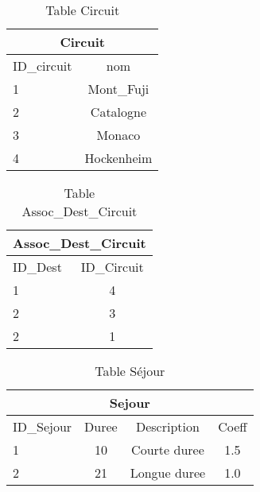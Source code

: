
\begin{table}[h]
\begin{center}
\begin{tabular}{|l|c|}
\hline
\multicolumn{2}{|c|}{Circuit}\\
\hline
ID\_circuit& nom \\
\hline
1 & Mont\_Fuji\\
\hline
2 & Catalogne\\
\hline
3 & Monaco\\
\hline
4 &  Hockenheim\\
\hline
\end{tabular}
\end{center}
\caption{Table Circuit}
\end{table}
\newpage


\begin{table}[h]
\begin{center}
\begin{tabular}{|l|c|}
\hline
\multicolumn{2}{|c|}{Assoc\_Dest\_Circuit}\\
\hline
ID\_Dest& ID\_Circuit \\
\hline
1 & 4\\
\hline
2 & 3\\
\hline
2 & 1\\
\hline
\end{tabular}
\end{center}
\caption{Table Assoc\_Dest\_Circuit}
\end{table}


\begin{table}[h]
\begin{center}
\begin{tabular}{|l|c|c|c|}
\hline
\multicolumn{4}{|c|}{Sejour}\\
\hline
ID\_Sejour& Duree & Description& Coeff\\
\hline
1 & 10& Courte duree & 1.5\\
\hline
2 & 21& Longue duree &1.0\\
\hline
\end{tabular}
\end{center}
\caption{Table S\'ejour}
\end{table}


